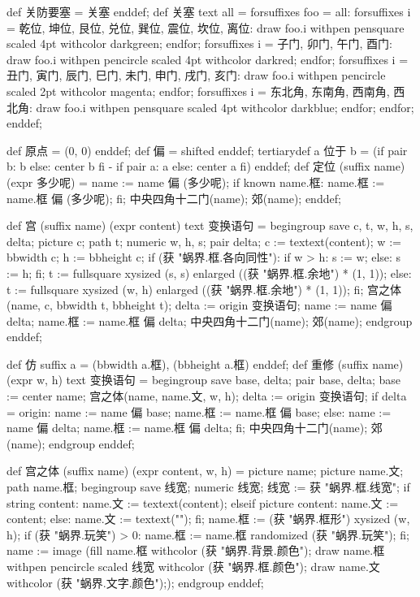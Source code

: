 def 关防要塞 = 关塞 enddef;
def 关塞 text all =
  forsuffixes foo = all:
    forsuffixes i = 乾位, 坤位, 艮位, 兑位, 巽位, 震位, 坎位, 离位:
      draw foo.i withpen pensquare scaled 4pt withcolor darkgreen;
    endfor;
    forsuffixes i = 子门, 卯门, 午门, 酉门:
      draw foo.i withpen pencircle scaled 4pt withcolor darkred;
    endfor;
    forsuffixes i = 丑门, 寅门, 辰门, 巳门, 未门, 申门, 戌门, 亥门:
      draw foo.i withpen pencircle scaled 2pt withcolor magenta;
    endfor;
    forsuffixes i = 东北角, 东南角, 西南角, 西北角:
      draw foo.i withpen pensquare scaled 4pt withcolor darkblue;
    endfor;
  endfor;
enddef;
\stopMPinclusions

\startMPinclusions[+]
def 原点 = (0, 0) enddef;
def 偏 = shifted enddef;
tertiarydef a 位于 b =
  (if pair b: b else: center b fi - if pair a: a else: center a fi)
enddef;
def 定位 (suffix name) (expr 多少呢) =
  name := name 偏 (多少呢);
  if known name.框:
    name.框 := name.框 偏 (多少呢);
  fi;
  中央四角十二门(name); 郊(name);
enddef;
\stopMPinclusions

\startMPinclusions[+]
def 宫 (suffix name) (expr content) text 变换语句 =
  begingroup
    save c, t, w, h, s, delta; 
    picture c; 
    path t; 
    numeric w, h, s; 
    pair delta;
    c := textext(content); 
    w := bbwidth c; 
    h := bbheight c;
    if (获 "蜗界.框.各向同性"):
      if w > h: s := w; else: s := h; fi;
      t := fullsquare xysized (s, s) enlarged ((获 "蜗界.框.余地") * (1, 1));
    else:
      t := fullsquare xysized (w, h) enlarged ((获 "蜗界.框.余地") * (1, 1));
    fi;
    宫之体(name, c, bbwidth t, bbheight t);
    delta := origin 变换语句;
    name := name 偏 delta;
    name.框 := name.框 偏 delta;
    中央四角十二门(name); 郊(name);
  endgroup
enddef;

def 仿 suffix a = (bbwidth a.框), (bbheight a.框) enddef;
def 重修 (suffix name) (expr w, h) text 变换语句 =
  begingroup
    save base, delta; pair base, delta; base := center name;
    宫之体(name, name.文, w, h);
    delta := origin 变换语句;
    if delta = origin:
      name := name 偏 base;
      name.框 := name.框 偏 base;
    else:
      name := name 偏 delta;
      name.框 := name.框 偏 delta;
    fi;
    中央四角十二门(name); 郊(name);
  endgroup
enddef;

def 宫之体 (suffix name) (expr content, w, h) =
  picture name; picture name.文; path name.框;
  begingroup
    save 线宽; numeric 线宽; 线宽 := 获 "蜗界.框.线宽";
    if string content:
      name.文 := textext(content);
    elseif picture content:
      name.文 := content;
    else:
      name.文 := textext("");
    fi;
    name.框 := (获 "蜗界.框形") xysized (w, h);
    if (获 "蜗界.玩笑") > 0: name.框 := name.框 randomized (获 "蜗界.玩笑"); fi;
    name := image (fill name.框 withcolor (获 "蜗界.背景.颜色");
                   draw name.框 withpen pencircle scaled 线宽
                   withcolor (获 "蜗界.框.颜色");
                   draw name.文 withcolor (获 "蜗界.文字.颜色"););
  endgroup
enddef;
\stopMPinclusions


